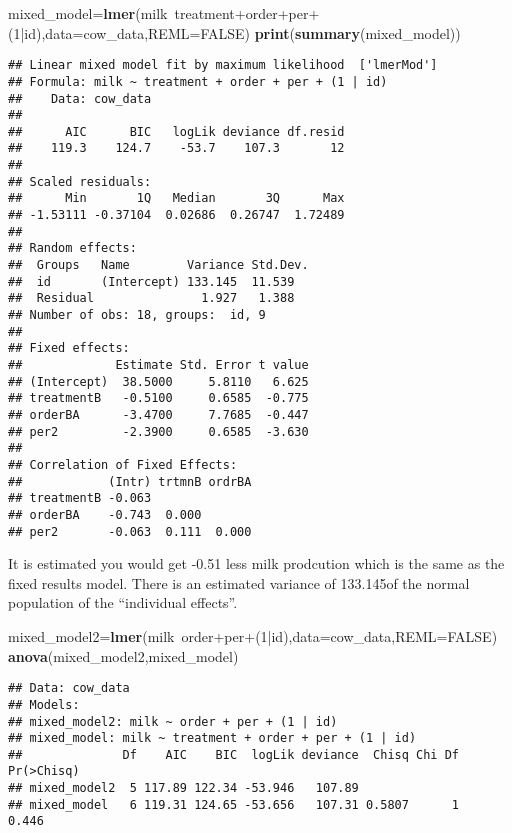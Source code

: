 \documentclass[11pt,]{article}
\newenvironment{Shaded}{\begin{snugshade}}{\end{snugshade}}
\newcommand{\KeywordTok}[1]{\textcolor[rgb]{0.13,0.29,0.53}{\textbf{{#1}}}}
\newcommand{\DataTypeTok}[1]{\textcolor[rgb]{0.13,0.29,0.53}{{#1}}}
\newcommand{\DecValTok}[1]{\textcolor[rgb]{0.00,0.00,0.81}{{#1}}}
\newcommand{\OtherTok}[1]{\textcolor[rgb]{0.56,0.35,0.01}{{#1}}}
\newcommand{\NormalTok}[1]{{#1}}
\begin{document}
\begin{Shaded}
\begin{Highlighting}[]
\NormalTok{mixed_model=}\KeywordTok{lmer}\NormalTok{(milk~treatment+order+per+(}\DecValTok{1}\NormalTok{|id),}\DataTypeTok{data=}\NormalTok{cow_data,}\DataTypeTok{REML=}\OtherTok{FALSE}\NormalTok{)}
\KeywordTok{print}\NormalTok{(}\KeywordTok{summary}\NormalTok{(mixed_model))}
\end{Highlighting}
\end{Shaded}

\begin{verbatim}
## Linear mixed model fit by maximum likelihood  ['lmerMod']
## Formula: milk ~ treatment + order + per + (1 | id)
##    Data: cow_data
## 
##      AIC      BIC   logLik deviance df.resid 
##    119.3    124.7    -53.7    107.3       12 
## 
## Scaled residuals: 
##      Min       1Q   Median       3Q      Max 
## -1.53111 -0.37104  0.02686  0.26747  1.72489 
## 
## Random effects:
##  Groups   Name        Variance Std.Dev.
##  id       (Intercept) 133.145  11.539  
##  Residual               1.927   1.388  
## Number of obs: 18, groups:  id, 9
## 
## Fixed effects:
##             Estimate Std. Error t value
## (Intercept)  38.5000     5.8110   6.625
## treatmentB   -0.5100     0.6585  -0.775
## orderBA      -3.4700     7.7685  -0.447
## per2         -2.3900     0.6585  -3.630
## 
## Correlation of Fixed Effects:
##            (Intr) trtmnB ordrBA
## treatmentB -0.063              
## orderBA    -0.743  0.000       
## per2       -0.063  0.111  0.000
\end{verbatim}

It is estimated you would get -0.51 less milk prodcution which is the
same as the fixed results model. There is an estimated variance of
133.145of the normal population of the ``individual effects''.

\begin{Shaded}
\begin{Highlighting}[]
\NormalTok{mixed_model2=}\KeywordTok{lmer}\NormalTok{(milk~order+per+(}\DecValTok{1}\NormalTok{|id),}\DataTypeTok{data=}\NormalTok{cow_data,}\DataTypeTok{REML=}\OtherTok{FALSE}\NormalTok{)}
\KeywordTok{anova}\NormalTok{(mixed_model2,mixed_model)}
\end{Highlighting}
\end{Shaded}

\begin{verbatim}
## Data: cow_data
## Models:
## mixed_model2: milk ~ order + per + (1 | id)
## mixed_model: milk ~ treatment + order + per + (1 | id)
##              Df    AIC    BIC  logLik deviance  Chisq Chi Df Pr(>Chisq)
## mixed_model2  5 117.89 122.34 -53.946   107.89                         
## mixed_model   6 119.31 124.65 -53.656   107.31 0.5807      1      0.446
\end{verbatim}
\end{document}
